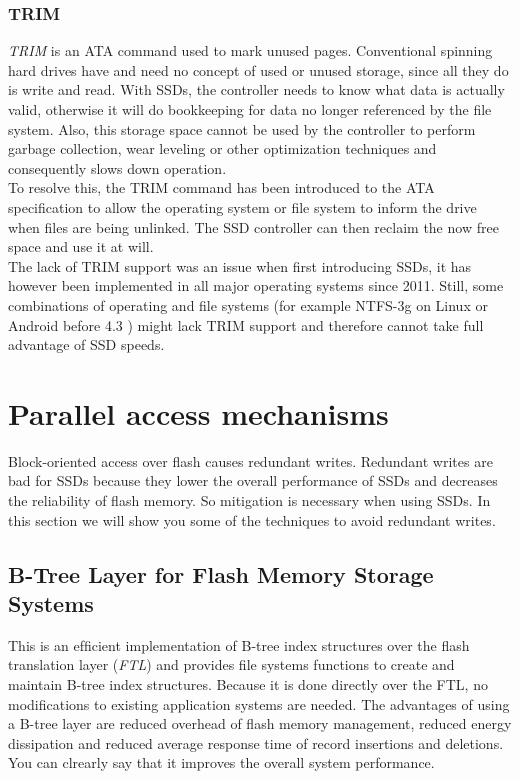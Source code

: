 \documentclass{acm_proc_article-sp}
\begin{document}
\subsubsection*{TRIM}
\emph{TRIM} is an ATA command used to mark unused pages. Conventional spinning hard drives have and need no concept of used or unused storage, since all they do is write and read. With SSDs, the controller needs to know what data is actually valid, otherwise it will do bookkeeping for data no longer referenced by the file system. Also, this storage space cannot be used by the controller to perform garbage collection, wear leveling or other optimization techniques and consequently slows down operation.
\\
To resolve this, the TRIM command has been introduced to the ATA specification to allow the operating system or file system to inform the drive when files are being unlinked. The SSD controller can then reclaim the now free space and use it at will.
\\
The lack of TRIM support was an issue when first introducing SSDs, it has however been implemented in all major operating systems since 2011. Still, some combinations of operating and file systems (for example NTFS-3g on Linux or Android before 4.3 \cite{androidtrim}) might lack TRIM support and therefore cannot take full advantage of SSD speeds.

\section{Parallel access mechanisms}
Block-oriented access over flash causes redundant writes. Redundant writes are bad for SSDs because they lower the overall performance of SSDs and decreases the reliability of flash memory. So mitigation is necessary when using SSDs. In this section we will show you some of the techniques to avoid redundant writes.

\subsection{B-Tree Layer for Flash Memory Storage Systems}
This is an efﬁcient implementation of B-tree index structures over the flash translation layer (\emph{FTL}) and provides ﬁle systems functions to create and maintain B-tree index structures. Because it is done directly over the FTL, no modiﬁcations to existing application systems are needed. The advantages of using a B-tree layer are reduced overhead of flash memory management, reduced energy dissipation and reduced average response time of record insertions and deletions. You can clrearly say that it improves the overall system performance. %
\end{document}
